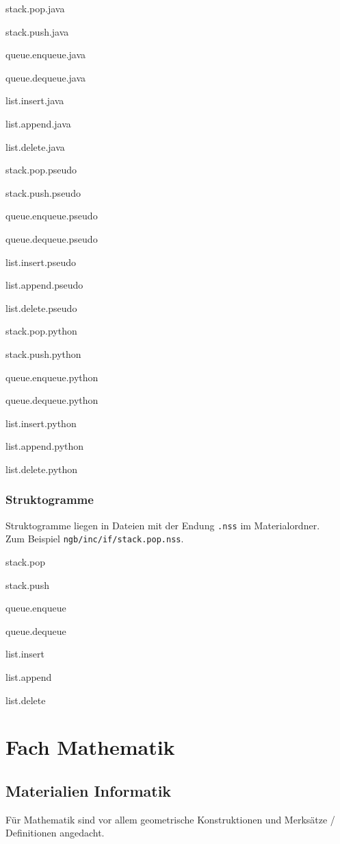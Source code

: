 \begin{multicols}{2}\ttfamily
	\begin{smallitemize}
		\item stack.pop.java
		\item stack.push.java
		\item queue.enqueue.java
		\item queue.dequeue.java
		\item list.insert.java
		\item list.append.java
		\item list.delete.java
		\item stack.pop.pseudo
		\item stack.push.pseudo
		\item queue.enqueue.pseudo
		\item queue.dequeue.pseudo
		\item list.insert.pseudo
		\item list.append.pseudo
		\item list.delete.pseudo
		\item stack.pop.python
		\item stack.push.python
		\item queue.enqueue.python
		\item queue.dequeue.python
		\item list.insert.python
		\item list.append.python
		\item list.delete.python
	\end{smallitemize}
\end{multicols}

\subsubsection{Struktogramme}
Struktogramme liegen in Dateien mit der Endung \texttt{.nss} im Materialordner. \\Zum Beispiel \texttt{ngb/inc/if/stack.pop.nss}.

\begin{multicols}{2}\ttfamily
	\begin{smallitemize}
		\item stack.pop
		\item stack.push
		\item queue.enqueue
		\item queue.dequeue
		\item list.insert
		\item list.append
		\item list.delete
	\end{smallitemize}
\end{multicols}

\section{Fach Mathematik}\label{sec:fachmathe}

\subsection{Materialien Informatik}\label{sec:materialmathe}
Für Mathematik sind vor allem geometrische Konstruktionen und Merksätze / Definitionen angedacht. 